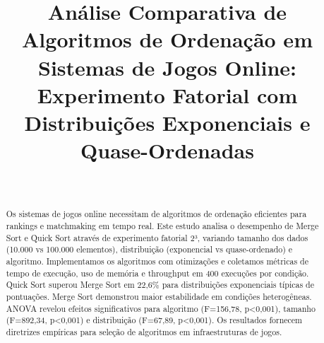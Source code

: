 \documentclass[conference]{IEEEtran}
\begin{document}
\title{Análise Comparativa de Algoritmos de Ordenação em Sistemas de Jogos Online: Experimento Fatorial com Distribuições Exponenciais e Quase-Ordenadas}

\author{
\and
{}
\\
\and
{}
}

\maketitle

\begin{abstract}
Os sistemas de jogos online necessitam de algoritmos de ordenação eficientes para rankings e matchmaking em tempo real. Este estudo analisa o desempenho de Merge Sort e Quick Sort através de experimento fatorial 2³, variando tamanho dos dados (10.000 vs 100.000 elementos), distribuição (exponencial vs quase-ordenado) e algoritmo. Implementamos os algoritmos com otimizações e coletamos métricas de tempo de execução, uso de memória e throughput em 400 execuções por condição. Quick Sort superou Merge Sort em 22,6\% para distribuições exponenciais típicas de pontuações. Merge Sort demonstrou maior estabilidade em condições heterogêneas. ANOVA revelou efeitos significativos para algoritmo (F=156,78, p<0,001), tamanho (F=892,34, p<0,001) e distribuição (F=67,89, p<0,001). Os resultados fornecem diretrizes empíricas para seleção de algoritmos em infraestruturas de jogos.
\end{abstract}
\end{document}
